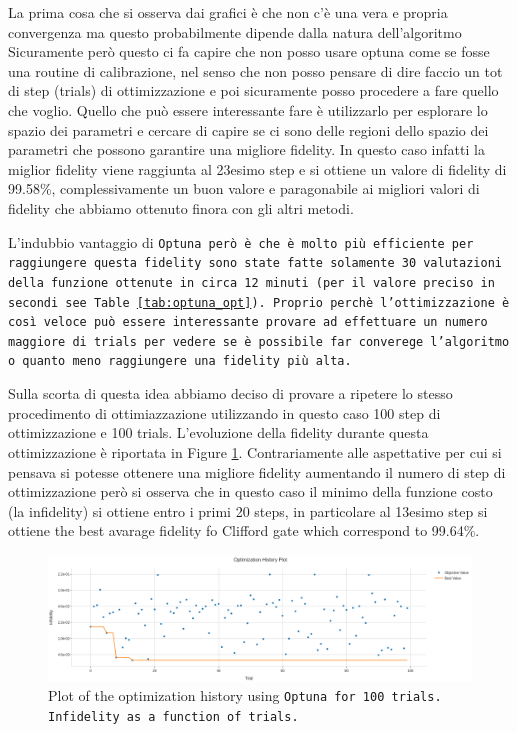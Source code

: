La prima cosa che si osserva dai grafici è che non c'è una vera e propria convergenza ma questo probabilmente dipende dalla natura dell'algoritmo %
Sicuramente però questo ci fa capire che non posso usare optuna come se fosse una routine di calibrazione, nel senso che non posso pensare di dire faccio un tot di step (trials) di ottimizzazione e poi sicuramente posso procedere a fare quello che voglio.
Quello che può essere interessante fare è utilizzarlo per esplorare lo spazio dei parametri e cercare di capire se ci sono delle regioni dello spazio dei parametri che possono garantire una migliore fidelity. 
In questo caso infatti la miglior fidelity viene raggiunta al 23esimo step e si ottiene un valore di fidelity di 99.58\%, complessivamente un buon valore e paragonabile ai migliori valori di fidelity che abbiamo ottenuto finora con gli altri metodi.

L'indubbio vantaggio di \tt{Optuna} però è che è molto più efficiente per raggiungere questa fidelity sono state fatte solamente 30 valutazioni della funzione ottenute in circa 12 minuti (per il valore preciso in secondi see Table \ref{tab:optuna_opt}).
Proprio perchè l'ottimizzazione è così veloce può essere interessante provare ad effettuare un numero maggiore di trials per vedere se è possibile far converege l'algoritmo o quanto meno raggiungere una fidelity più alta.

Sulla scorta di questa idea abbiamo deciso di provare a ripetere lo stesso procedimento di ottimiazzazione utilizzando in questo caso 100 step di ottimizzazione e 100 trials. 
L'evoluzione della fidelity durante questa ottimizzazione è riportata in Figure \ref{fig:optuna100:optimization}.
Contrariamente alle aspettative per cui si pensava si potesse ottenere una migliore fidelity aumentando il numero di step di ottimizzazione però si osserva che in questo caso il minimo della funzione costo (la infidelity) si ottiene entro i primi 20 steps,
in particolare al 13esimo step si ottiene the best avarage fidelity fo Clifford gate which correspond to 99.64\%.

\begin{figure}[h!]
    \centering
    \includegraphics[width=\textwidth]{figures/png/RB_optimization/Optuna/100/optimization.png}
    \caption{Plot of the optimization history using \tt{Optuna} for 100 trials. Infidelity as a function of trials.}
    \label{fig:optuna100:optimization}
\end{figure}

